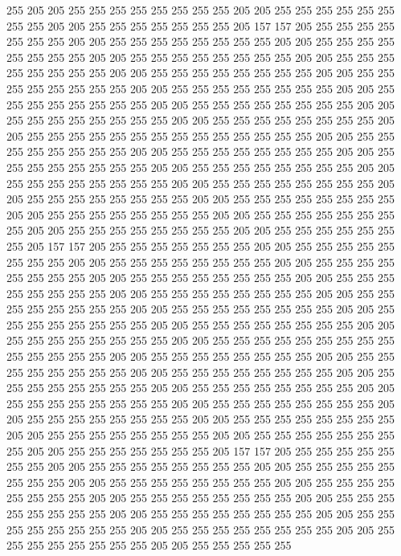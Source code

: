255 205 205 255 255 255 255 255 255 255 255 205 205 255 255 255 255 255 255 255
255 205 205 255 255 255 255 255 255 255 205 157 157 205 255 255 255 255 255 255
255 205 205 255 255 255 255 255 255 255 255 205 205 255 255 255 255 255 255 255
255 205 205 255 255 255 255 255 255 255 255 205 205 255 255 255 255 255 255 255
255 205 205 255 255 255 255 255 255 255 255 205 205 255 255 255 255 255 255 255
255 205 205 255 255 255 255 255 255 255 255 205 205 255 255 255 255 255 255 255
255 205 205 255 255 255 255 255 255 255 255 205 205 255 255 255 255 255 255 255
255 205 205 255 255 255 255 255 255 255 255 205 205 255 255 255 255 255 255 255
255 255 255 255 255 255 255 205 205 255 255 255 255 255 255 255 255 205 205 255
255 255 255 255 255 255 255 205 205 255 255 255 255 255 255 255 255 205 205 255
255 255 255 255 255 255 255 205 205 255 255 255 255 255 255 255 255 205 205 255
255 255 255 255 255 255 255 205 205 255 255 255 255 255 255 255 255 205 205 255
255 255 255 255 255 255 255 205 205 255 255 255 255 255 255 255 255 205 205 255
255 255 255 255 255 255 255 205 205 255 255 255 255 255 255 255 255 205 205 255
255 255 255 255 255 255 205 157 157 205 255 255 255 255 255 255 255 205 205 255
255 255 255 255 255 255 255 205 205 255 255 255 255 255 255 255 255 205 205 255
255 255 255 255 255 255 255 205 205 255 255 255 255 255 255 255 255 205 205 255
255 255 255 255 255 255 255 205 205 255 255 255 255 255 255 255 255 205 205 255
255 255 255 255 255 255 255 205 205 255 255 255 255 255 255 255 255 205 205 255
255 255 255 255 255 255 255 205 205 255 255 255 255 255 255 255 255 205 205 255
255 255 255 255 255 255 255 205 205 255 255 255 255 255 255 255 255 255 255 255
255 255 255 205 205 255 255 255 255 255 255 255 255 205 205 255 255 255 255 255
255 255 255 205 205 255 255 255 255 255 255 255 255 205 205 255 255 255 255 255
255 255 255 205 205 255 255 255 255 255 255 255 255 205 205 255 255 255 255 255
255 255 255 205 205 255 255 255 255 255 255 255 255 205 205 255 255 255 255 255
255 255 255 205 205 255 255 255 255 255 255 255 255 205 205 255 255 255 255 255
255 255 255 205 205 255 255 255 255 255 255 255 255 205 205 255 255 255 255 255
255 255 205 157 157 205 255 255 255 255 255 255 255 205 205 255 255 255 255 255
255 255 255 205 205 255 255 255 255 255 255 255 255 205 205 255 255 255 255 255
255 255 255 205 205 255 255 255 255 255 255 255 255 205 205 255 255 255 255 255
255 255 255 205 205 255 255 255 255 255 255 255 255 205 205 255 255 255 255 255
255 255 255 205 205 255 255 255 255 255 255 255 255 205 205 255 255 255 255 255
255 255 255 205 205 255 255 255 255 255 255 255 255 205 205 255 255 255 255 255
